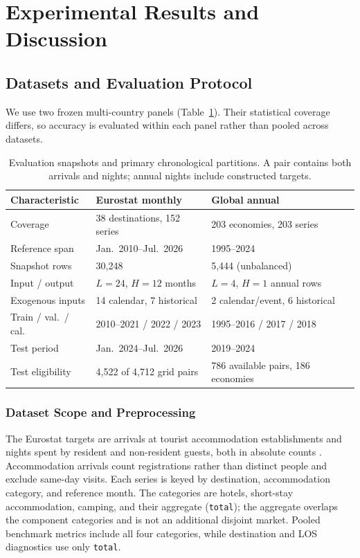\documentclass[sigconf]{acmart}
\begin{document}
\section{Experimental Results and Discussion}
\label{sec:results}

\subsection{Datasets and Evaluation Protocol}
\label{sec:experimental_setup}
We use two frozen multi-country panels (Table~\ref{tab:datasets}). Their statistical coverage differs, so accuracy is evaluated within each panel rather than pooled across datasets.

\begin{table}[!t]
\centering
\caption{Evaluation snapshots and primary chronological partitions. A pair contains both arrivals and nights; annual nights include constructed targets.}
\label{tab:datasets}
\scriptsize
\setlength{\tabcolsep}{2.5pt}
\renewcommand{\arraystretch}{1.01}
\begin{tabular}{@{}p{}p{}p{}@{}}
\toprule
\textbf{Characteristic} & \textbf{Eurostat monthly} & \textbf{Global annual} \\
\midrule
Coverage & 38 destinations, 152 series & 203 economies, 203 series \\
Reference span & Jan.\ 2010--Jul.\ 2026 & 1995--2024 \\
Snapshot rows & 30,248 & 5,444 (unbalanced) \\
Input / output & $L=24$, $H=12$ months & $L=4$, $H=1$ annual rows \\
Exogenous inputs & 14 calendar, 7 historical & 2 calendar/event, 6 historical \\
Train / val.\ / cal. & 2010--2021 / 2022 / 2023 & 1995--2016 / 2017 / 2018 \\
Test period & Jan.\ 2024--Jul.\ 2026 & 2019--2024 \\
Test eligibility & 4,522 of 4,712 grid pairs & 786 available pairs, 186 economies \\
\bottomrule
\end{tabular}
\end{table}

\subsubsection{Dataset Scope and Preprocessing}
The Eurostat targets are arrivals at tourist accommodation establishments and nights spent by resident and non-resident guests, both in absolute counts \cite{eurostat_tourism_release,eurostat_tourism_scope}. Accommodation arrivals count registrations rather than distinct people and exclude same-day visits. Each series is keyed by destination, accommodation category, and reference month. The categories are hotels, short-stay accommodation, camping, and their aggregate (\texttt{total}); the aggregate overlaps the component categories and is not an additional disjoint market. Pooled benchmark metrics include all four categories, while destination and LOS diagnostics use only \texttt{total}.
\end{document}
